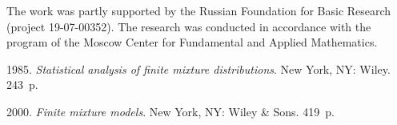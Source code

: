 



\vspace*{-3pt}

 \Ack
\noindent
The work was partly supported by the Russian Foundation for Basic Research (project 19-07-00352). 
The research was conducted in accordance with the program of the Moscow Center for 
Fundamental and Applied Mathematics.

\vspace*{6pt}

  \begin{multicols}{2}

\renewcommand{\bibname}{\protect\rmfamily References}

{\small\frenchspacing
 {%
 \begin{thebibliography}{99}

 1985. \textit{Statistical analysis of finite mixture distributions}. New York, NY: Wiley. 243~p.
 
 2000. 
\textit{Finite mixture models}. New York, NY: Wiley \& Sons. 419~p.


\end{thebibliography}}}
\end{multicols}

